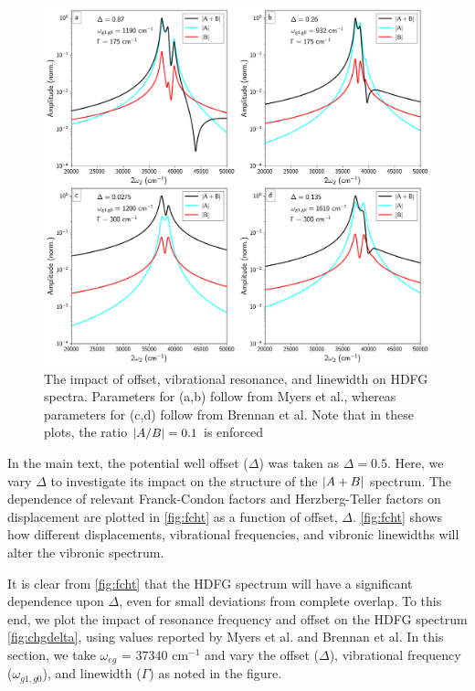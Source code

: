 \documentclass[aip, jcp, reprint, onecolumn, nofootinbib]{revtex4-2}
\begin{document}
\begin{figure}[!htbp]
	\centering
	\includegraphics[width=6.675in]{figures/changedelta.png}
	\caption{The impact of offset, vibrational resonance, and linewidth on HDFG spectra. Parameters for (a,b) follow from Myers et al., whereas parameters for (c,d) follow from Brennan et al.\cite{Myers1982, Brennan2024}
	Note that in these plots, the ratio $\abs{A/B} = 0.1$ is enforced} 
	\label{fig:chgdelta}
\end{figure}

\pagebreak

In the main text, the potential well offset ($\Delta$) was taken as $\Delta = 0.5$.
Here, we vary $\Delta$ to investigate its impact on the structure of the $\abs{A+B}$ spectrum.
The dependence of relevant Franck-Condon factors and Herzberg-Teller factors on displacement are plotted in \autoref{fig:fcht} as a function of offset, $\Delta$.
\autoref{fig:fcht} shows how different displacements, vibrational frequencies, and vibronic linewidths will alter the vibronic spectrum.

It is clear from \autoref{fig:fcht} that the HDFG spectrum will have a significant dependence upon $\Delta$, even for small deviations from complete overlap. 
To this end, we plot the impact of resonance frequency and offset on the HDFG spectrum \autoref{fig:chgdelta}, using values reported by Myers et al. and Brennan et al. \cite{Myers1982, Brennan2024}
In this section, we take $\omega_{eg}$ = $37340$ cm$^{-1}$ and vary the offset ($\Delta$), vibrational frequency ($\omega_{g1,g0}$), and linewidth ($\Gamma$) as noted in the figure.
\end{document}
